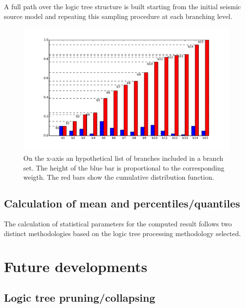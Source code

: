 A full path over the logic tree structure is built starting from the 
initial seismic source model and repeating this sampling procedure 
at each branching level.
%
\begin{figure}[ht]
\centering
\includegraphics[trim = 20mm 5mm 5mm 10mm, clip, width=14cm]
    {./Pictures/lts/histogram_mc_sampl.pdf}
\caption{On the x-axis an hypothetical list of branches 
    included in a branch set. The height of the blue bar is proportional to 
    the corresponding weigth. The red bars show the cumulative distribution 
    function.}
\label{fig:logic_tree_mc_samp}
\end{figure}
%
\subsection{Calculation of mean and percentiles/quantiles}
The calculation of statistical parameters for the computed result follows 
two distinct methodologies based on the logic tree processing methodology 
selected.
%
\clearpage
\section{Future developments}
%
\subsection{Logic tree pruning/collapsing}
